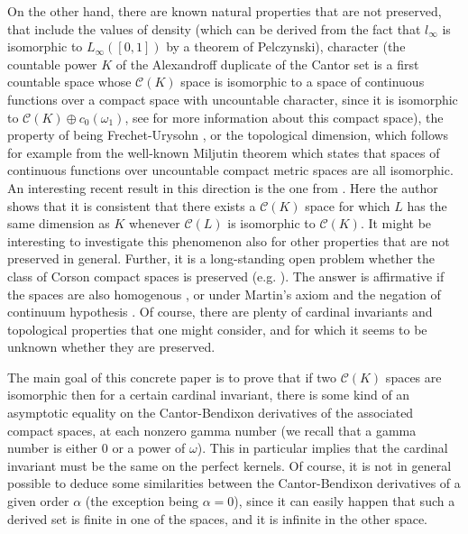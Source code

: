 \documentclass{amsart}
\numberwithin{equation}{section}
\theoremstyle{definition}
\def\C{\mathcal C}
\begin{document}
On the other hand, there are known natural properties that are not preserved, that include the values of density (which can be derived from the fact that $l_{\infty}$ is isomorphic to $L_{\infty}([0, 1])$ by a theorem of Pelczynski), character (the countable power $K$ of the Alexandroff duplicate of the Cantor set is a first countable space whose $\C(K)$ space is isomorphic to a space of continuous functions over a compact space with uncountable character, since it is isomorphic to $\C(K) \oplus c_0(\omega_1)$, see \cite[comments before theorem 4.15]{Marciszewski_eberlein_problems} for more information about this compact space), the property of being Frechet-Urysohn \cite{Okunev_frechet}, or the topological dimension, which follows for example from the well-known Miljutin theorem \cite[Theorem 2.1]{RosenthalC(K)} which states that spaces of continuous functions over uncountable compact metric spaces are all isomorphic.
An interesting recent result in this direction is the one from \cite{Glodkowski_C(K)_dimension}. Here the author shows that it is consistent that there exists a $\C(K)$ space for which $L$ has the same dimension as $K$ whenever $\C(L)$ is isomorphic to $\C(K)$. It might be interesting to investigate this phenomenon also for other properties that are not preserved in general.
Further, it is a long-standing open problem whether the class of Corson compact spaces is preserved (e.g. \cite[Question 1]{KOSZMIDER_interplay_K_C(K)}). The answer is affirmative if the spaces are also homogenous \cite[Corollary 6.3]{Plebanek2015}, or under Martin’s axiom and the negation of continuum hypothesis \cite{Argyros_Mer_Neg_1988}. Of course, there are plenty of cardinal invariants and topological properties that one might consider, and for which it seems to be unknown whether they are preserved.

The main goal of this concrete paper is to prove that if two $\C(K)$ spaces are isomorphic then for a certain cardinal invariant, there is some kind of an asymptotic equality on the Cantor-Bendixon derivatives of the associated compact spaces, at each nonzero gamma number (we recall that a gamma number is either $0$ or a power of $\omega$). This in particular implies that the cardinal invariant must be the same on the perfect kernels. Of course, it is not in general possible to deduce some similarities between the Cantor-Bendixon derivatives of a given order $\alpha$ (the exception being $\alpha=0$), since it can easily happen that such a derived set is finite in one of the spaces, and it is infinite in the other space.
\end{document}
